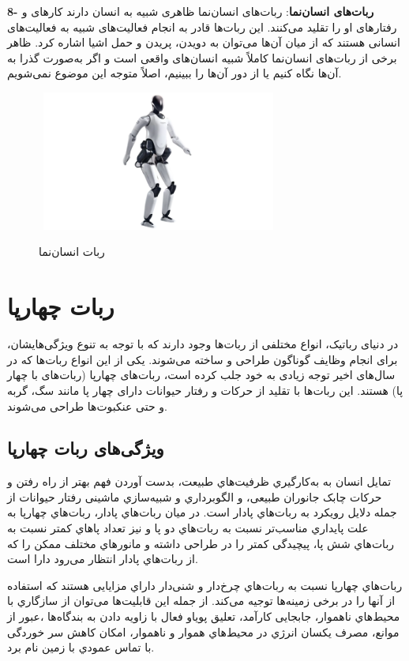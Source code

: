 \textbf{8- ربات‌های انسان‌نما}:  
  ربات‌های انسان‌نما ظاهری شبیه به انسان دارند کارهای و رفتارهای او را تقلید می‌کنند. این ربات‌ها قادر به انجام فعالیت‌های شبیه به فعالیت‌های انسانی هستند که از میان آن‌ها می‌توان به دویدن، پریدن و حمل اشیا اشاره کرد. ظاهر برخی از ربات‌های انسان‌نما کاملاً شبیه انسان‌های واقعی است و اگر به‌صورت گذرا به آن‌ها نگاه کنیم یا از دور آن‌ها را ببینیم، اصلاً متوجه این موضوع نمی‌شویم.
    \begin{figure}[!h]
  	\vspace{0.2cm}
  	\centering
  	\includegraphics[height=4.6cm,width=8cm]{./Images/CH1/humanoid_robot.png}
  	‌\caption{ربات انسان‌نما}
  	\label{ربات انسان‌نما}
    \end{figure}
    
\section{ربات چهارپا}
در دنیای رباتیک، انواع مختلفی از ربات‌ها وجود دارند که با توجه به تنوع ویژگی‌هایشان، برای انجام وظایف گوناگون طراحی و ساخته می‌شوند. یکی از این انواع ربات‌ها که در سال‌های اخیر توجه زیادی به خود جلب کرده است، ربات‌های چهارپا (ربات‌های با چهار پا) هستند. این ربات‌ها با تقلید از حرکات و رفتار حیوانات دارای چهار پا مانند سگ، گربه و حتی عنکبوت‌ها طراحی می‌شوند.
\subsection{ویژگی‌های ربات چهارپا}
تمایل انسان به به‌كارگیري ظرفیت‌هاي طبیعت، بدست آوردن فهم بهتر از راه رفتن و حرکات چابک جانوران طبیعی، و الگوبرداري و شبیه‌سازي ماشینی رفتار حیوانات از جمله دلایل رویكرد به ربات‌هاي پادار است. در میان ربات‌هاي پادار، ربات‌هاي چهارپا به علت پایداري مناسب‌تر نسبت به ربات‌هاي دو پا و نیز تعداد پاهاي کمتر نسبت به ربات‌هاي شش پا، پیچیدگی کمتر را در طراحی داشته و مانورهاي مختلف ممكن را که از ربات‌هاي پادار انتظار می‌رود دارا است.

ربات‌هاي چهارپا نسبت به ربات‌هاي چرخ‌دار و شنی‌دار داراي مزایایی هستند که استفاده از آنها را در برخی زمینه‌ها توجیه می‌کند. از جمله این قابلیت‌ها می‌توان از سازگاري با محیط‌هاي ناهموار، جابجایی کارآمد، تعلیق پویاو فعال با زاویه دادن به بندگاه‌ها
\unskip{}
،عبور از موانع، مصرف یكسان انرژي در محیط‌هاي هموار و ناهموار، امكان کاهش سر خوردگی با تماس عمودي با زمین نام برد.

